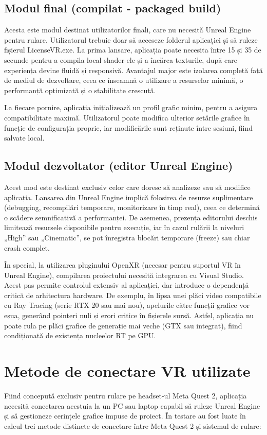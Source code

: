 \subsection{Modul final (compilat - packaged build)}

Acesta este modul destinat utilizatorilor finali, care nu necesită Unreal Engine pentru rulare. Utilizatorul trebuie doar să acceseze folderul aplicației și să ruleze fișierul LicenseVR.exe. La prima lansare, aplicația poate necesita între 15 și 35 de secunde pentru a compila local shader-ele și a încărca texturile, după care experiența devine fluidă și responsivă. Avantajul major este izolarea completă față de mediul de dezvoltare, ceea ce înseamnă o utilizare a resurselor minimă, o performanță optimizată și o stabilitate crescută.

La fiecare pornire, aplicația inițializează un profil grafic minim, pentru a asigura compatibilitate maximă. Utilizatorul poate modifica ulterior setările grafice în funcție de configurația proprie, iar modificările sunt reținute între sesiuni, fiind salvate local.

\subsection{Modul dezvoltator (editor Unreal Engine)}

Acest mod este destinat exclusiv celor care doresc să analizeze sau să modifice aplicația. Lansarea din Unreal Engine implică folosirea de resurse suplimentare (debugging, recompilări temporare, monitorizare în timp real), ceea ce determină o scădere semnificativă a performanței. De asemenea, prezența editorului deschis limitează resursele disponibile pentru execuție, iar în cazul rulării la niveluri „High” sau „Cinematic”, se pot înregistra blocări temporare (freeze) sau chiar crash complet.

În special, la utilizarea pluginului OpenXR (necesar pentru suportul VR în Unreal Engine), compilarea proiectului necesită integrarea cu Visual Studio. Acest pas permite controlul extensiv al aplicației, dar introduce o dependență critică de arhitectura hardware. De exemplu, în lipsa unei plăci video compatibile cu Ray Tracing (serie RTX 20 sau mai nou), apelurile către funcții grafice vor eșua, generând pointeri nuli și erori critice în fișierele sursă. Astfel, aplicația nu poate rula pe plăci grafice de generație mai veche (GTX sau integrat), fiind condiționată de existența nucleelor RT pe GPU.

\section{Metode de conectare VR utilizate}
Fiind concepută exclusiv pentru rulare pe headset-ul Meta Quest 2, aplicația necesită conectarea acestuia la un PC sau laptop capabil să ruleze Unreal Engine și să gestioneze cerințele grafice impuse de proiect. În testare au fost luate în calcul trei metode distincte de conectare între Meta Quest 2 și sistemul de rulare:

